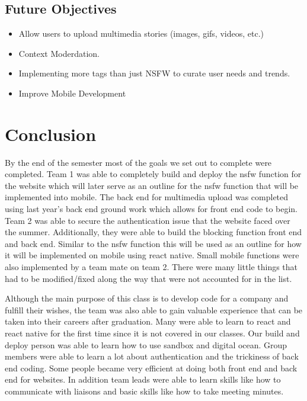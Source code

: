 \documentclass{article}
\begin{document}
\subsection{Future Objectives}
    \begin{itemize}
        \item Allow users to upload multimedia stories (images, gifs, videos, etc.)
        \item Context Moderdation.
        \item Implementing more tags than just NSFW to curate user needs and trends.
        \item Improve Mobile Development
    \end{itemize}


\section*{Conclusion}
By the end of the semester most of the goals we set out to complete were
completed. Team 1 was able to completely build and deploy the nsfw function for the
website which will later serve as an outline for the nsfw function that will be
implemented into mobile. The back end for multimedia upload was completed using
last year's back end ground work which allows for front end code to begin. Team 2
was able to secure the authentication issue that the website faced over the summer.
Additionally, they were able to build the blocking function front end and back end.
Similar to the nsfw function this will be used as an outline for how it will be
implemented on mobile using react native. Small mobile functions were also
implemented by a team mate on team 2. There were many little things that had to be
modified/fixed along the way that were not accounted for in the list.

Although the main purpose of this class is to develop code for a company and fulfill
their wishes, the team was also able to gain valuable experience that can be taken
into their careers after graduation. Many were able to learn to react and react native
for the first time since it is not covered in our classes. Our build and deploy person
was able to learn how to use sandbox and digital ocean. Group members were able
to learn a lot about authentication and the trickiness of back end coding. Some
people became very efficient at doing both front end and back end for websites. In
addition team leads were able to learn skills like how to communicate with liaisons
and basic skills like how to take meeting minutes.
\end{document}
